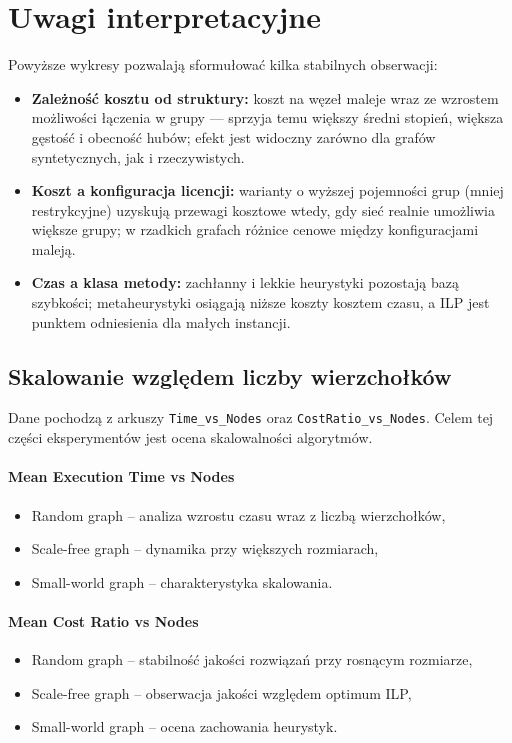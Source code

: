 \section{Uwagi interpretacyjne}
Powyższe wykresy pozwalają sformułować kilka stabilnych obserwacji:
\begin{itemize}
  \item \textbf{Zależność kosztu od struktury:} koszt na węzeł maleje wraz ze wzrostem możliwości łączenia w grupy — sprzyja temu większy średni stopień, większa gęstość i obecność hubów; efekt jest widoczny zarówno dla grafów syntetycznych, jak i rzeczywistych.
  \item \textbf{Koszt a konfiguracja licencji:} warianty o wyższej pojemności grup (mniej restrykcyjne) uzyskują przewagi kosztowe wtedy, gdy sieć realnie umożliwia większe grupy; w rzadkich grafach różnice cenowe między konfiguracjami maleją.
  \item \textbf{Czas a klasa metody:} zachłanny i lekkie heurystyki pozostają bazą szybkości; metaheurystyki osiągają niższe koszty kosztem czasu, a ILP jest punktem odniesienia dla małych instancji.
\end{itemize}

\subsection{Skalowanie względem liczby wierzchołków}

Dane pochodzą z arkuszy \texttt{Time\_vs\_Nodes} oraz \texttt{CostRatio\_vs\_Nodes}. 
Celem tej części eksperymentów jest ocena skalowalności algorytmów.

\paragraph{Mean Execution Time vs Nodes}
\begin{itemize}
    \item Random graph – analiza wzrostu czasu wraz z liczbą wierzchołków,
    \item Scale-free graph – dynamika przy większych rozmiarach,
    \item Small-world graph – charakterystyka skalowania.
\end{itemize}

\paragraph{Mean Cost Ratio vs Nodes}
\begin{itemize}
    \item Random graph – stabilność jakości rozwiązań przy rosnącym rozmiarze,
    \item Scale-free graph – obserwacja jakości względem optimum ILP,
    \item Small-world graph – ocena zachowania heurystyk.
\end{itemize}

